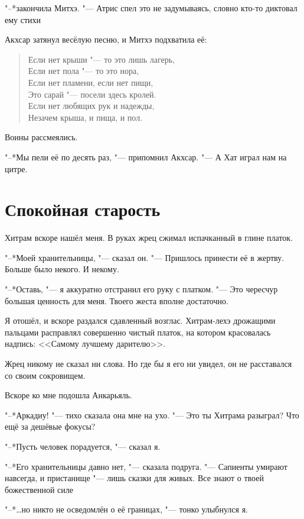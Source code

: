 "--*закончила Митхэ.
"--- Атрис спел это не задумываясь, словно кто-то диктовал ему стихи\ldotst

Акхсар затянул весёлую песню, и Митхэ подхватила её:

\begin{verse}
Если нет крыши "--- то это лишь лагерь,\\
Если нет пола "--- то это нора,\\
Если нет пламени, если нет пищи,\\
Это сарай "--- посели здесь кролей.\\
Если нет любящих рук и надежды,\\
Незачем крыша, и пища, и пол.
\end{verse}

Воины рассмеялись.

"--*Мы пели её по десять раз, "--- припомнил Акхсар.
"--- А Хат играл нам на цитре.

\section{Спокойная старость}

Хитрам вскоре нашёл меня.
В руках жрец сжимал испачканный в глине платок.

"--*Моей хранительницы, "--- сказал он.
"--- Пришлось принести её в жертву.
Больше было некого.
И некому.

"--*Оставь, "--- я аккуратно отстранил его руку с платком.
"--- Это чересчур большая ценность для меня.
Твоего жеста вполне достаточно.

Я отошёл, и вскоре раздался сдавленный возглас.
Хитрам-лехэ дрожащими пальцами расправлял совершенно чистый платок, на котором красовалась надпись: <<Самому лучшему дарителю>>.

Жрец никому не сказал ни слова.
Но где бы я его ни увидел, он не расставался со своим сокровищем.

Вскоре ко мне подошла Анкарьяль.

"--*Аркадиу! "--- тихо сказала она мне на ухо.
"--- Это ты Хитрама разыграл?
Что ещё за дешёвые фокусы?

"--*Пусть человек порадуется, "--- сказал я.

"--*Его хранительницы давно нет, "--- сказала подруга.
"--- Сапиенты умирают навсегда, и пристанище "--- лишь сказки для живых.
Все знают о твоей божественной силе\ldotst

"--*\ldots но никто не осведомлён о её границах, "--- тонко улыбнулся я.

